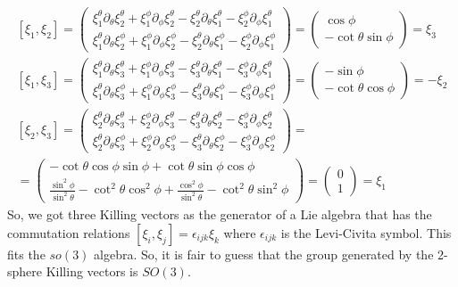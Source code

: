 \documentclass{article}
\begin{document}
\begin{equation}
\begin{gathered}
    [\xi_1,\xi_2] = \begin{pmatrix}
        \xi_1^\theta\partial_\theta\xi_2^\theta + \xi_1^\phi\partial_\phi\xi_2^\theta - \xi_2^\theta\partial_\theta\xi_1^\theta - \xi_2^\phi\partial_\phi\xi_1^\theta \\
        \xi_1^\theta\partial_\theta\xi_2^\phi + \xi_1^\phi\partial_\phi\xi_2^\phi - \xi_2^\theta\partial_\theta\xi_1^\phi - \xi_2^\phi\partial_\phi\xi_1^\phi
    \end{pmatrix} = \begin{pmatrix}
        \cos\phi \\ -\cot\theta\sin\phi
    \end{pmatrix} = \xi_3
    \\
    [\xi_1,\xi_3] = \begin{pmatrix}
        \xi_1^\theta\partial_\theta\xi_3^\theta + \xi_1^\phi\partial_\phi\xi_3^\theta - \xi_3^\theta\partial_\theta\xi_1^\theta - \xi_3^\phi\partial_\phi\xi_1^\theta \\
        \xi_1^\theta\partial_\theta\xi_3^\phi + \xi_1^\phi\partial_\phi\xi_3^\phi - \xi_3^\theta\partial_\theta\xi_1^\phi - \xi_3^\phi\partial_\phi\xi_1^\phi
    \end{pmatrix} = \begin{pmatrix}
        -\sin\phi \\ -\cot\theta\cos\phi
    \end{pmatrix} = -\xi_2
    \\
    [\xi_2,\xi_3] = \begin{pmatrix}
        \xi_2^\theta\partial_\theta\xi_3^\theta + \xi_2^\phi\partial_\phi\xi_3^\theta - \xi_3^\theta\partial_\theta\xi_2^\theta - \xi_3^\phi\partial_\phi\xi_2^\theta \\
        \xi_2^\theta\partial_\theta\xi_3^\phi + \xi_2^\phi\partial_\phi\xi_3^\phi - \xi_3^\theta\partial_\theta\xi_2^\phi - \xi_3^\phi\partial_\phi\xi_2^\phi
    \end{pmatrix} = \\ = \begin{pmatrix}
        -\cot\theta\cos\phi\sin\phi + \cot\theta\sin\phi\cos\phi \\
        \frac{\sin^2\phi}{\sin^2\theta} -
        \cot^2\theta\cos^2\phi + \frac{\cos^2\phi}{\sin^2\theta} - \cot^2\theta\sin^2\phi
    \end{pmatrix} = \begin{pmatrix}
        0 \\ 1
    \end{pmatrix} = \xi_1
\end{gathered}
\end{equation}
So, we got three Killing vectors as the generator of a Lie algebra that has the commutation relations $[\xi_i,\xi_j] = \epsilon_{ijk}\xi_k$ where $\epsilon_{ijk}$ is the Levi-Civita symbol. This fits the $so(3)$ algebra. So, it is fair to guess that the group generated by the 2-sphere Killing vectors is $SO(3)$.
\end{document}
